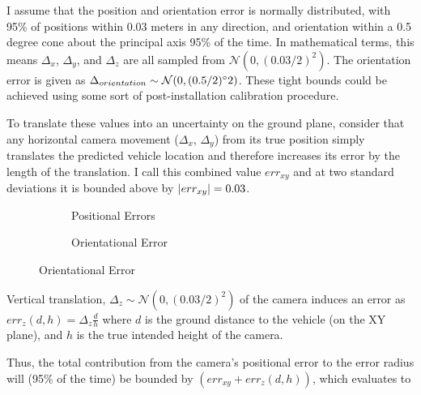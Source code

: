 \documentclass[a4paper,12pt,twoside,openright]{report}
\begin{document}
I assume that the position and orientation error is normally distributed, with
95\% of positions within 0.03 meters in any direction, 
and orientation within a 0.5 degree cone about the principal axis 95\% of the time.
In mathematical terms, this means $\Delta_{x}$, $\Delta_{y}$, and $\Delta_{z}$ 
are all sampled from $\mathcal{N}(0, (0.03/2)^2)$. The orientation error is given as
$\Delta_{orientation} \sim \mathcal{N}(0, (0.5/2)\degree2)$.
These tight bounds could be achieved using some sort of post-installation 
calibration procedure. 



To translate these values into an uncertainty on the ground plane, consider that
any horizontal camera movement ($\Delta_{x}$, $\Delta_{y}$) from its true position simply translates
the predicted vehicle location and therefore increases its error by the length of the translation.
I call this combined value $err_{xy}$ and at two standard deviations it is bounded above by
$\abs{err_{xy}} = 0.03$.

\begin{figure}[hbh]
\centering
\begin{subfigure}[b]{.45\textwidth}
  \centering
  \resizebox{\linewidth}{!}{} 
  \caption{Positional Errors}
  \label{fig:camera:xyz error}
\end{subfigure}%
\begin{subfigure}[b]{.45\textwidth}
  \centering
  \resizebox{\linewidth}{!}{}
  \caption{Orientational Error}
  \label{fig:camera:orient error}
\end{subfigure}
\label{fig:camera:errors}
\end{figure}
Vertical translation, $\Delta_z\sim \mathcal{N}(0, (0.03/2)^2)$
of the camera induces an error as $err_{z}(d, h) = \Delta_z \frac{d}{h}$ %
where $d$ is the ground distance to the vehicle (on the XY plane), and $h$ is the true intended
height of the camera.

Thus, the total contribution from the camera's positional error to the error radius
will (95\% of the time) be bounded by $(err_{xy} + err_{z}(d, h))$, which evaluates to
\end{document}
